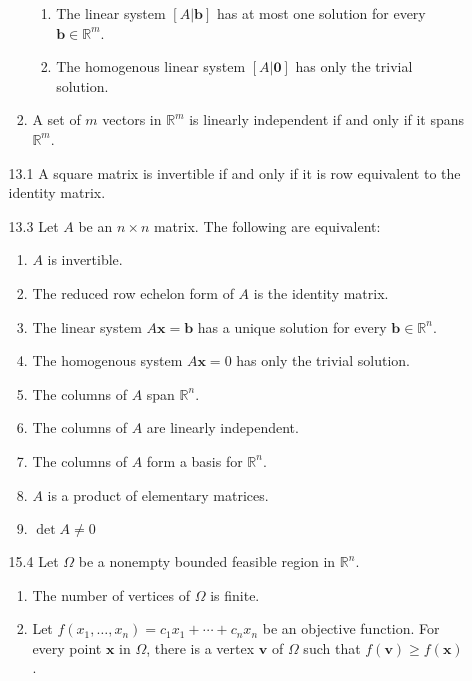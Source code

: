 \documentclass{article}
\begin{document}
\begin{multicols}{2}
\begin{itemize}[leftmargin=0.5cm]
\begin{enumerate}
\begin{enumerate}
\begin{enumerate}
                            \item The linear system $[A|\textbf{b}]$ has at most one solution for every $\textbf{b}\in\mathbb{R}^m$.
                            \item The homogenous linear system $[A|\textbf{0}]$ has only the trivial solution.
                        \end{enumerate}
                    \item A set of $m$ vectors in $\mathbb{R}^m$ is linearly independent if and only if it spans $\mathbb{R}^m$.
                \end{enumerate}
            \item[13.1] A square matrix is invertible if and only if it is row equivalent to the identity matrix.
            \item [13.3] Let $A$ be an $n\times n$ matrix. The following are equivalent:
                \begin{enumerate}
                    \item $A$ is invertible.
                    \item The reduced row echelon form of $A$ is the identity matrix.
                    \item The linear system $A\textbf{x}=\textbf{b}$ has a unique solution for every $\textbf{b}\in\mathbb{R}^n$.
                    \item The homogenous system $A\textbf{x}=0$ has only the trivial solution.
                    \item The columns of $A$ span $\mathbb{R}^n$.
                    \item The columns of $A$ are linearly independent.
                    \item The columns of $A$ form a basis for $\mathbb{R}^n$.
                    \item $A$ is a product of elementary matrices.
                    \item $\det{A}\neq0$
                \end{enumerate}
            \item[15.4] Let $\Omega$ be a nonempty bounded feasible region in $\mathbb{R}^n$.
                \begin{enumerate}
                    \item The number of vertices of $\Omega$ is finite.
                    \item Let $f(x_1,\ldots,x_n)=c_1x_1+\cdots+c_nx_n$ be an objective function. For every point $\textbf{x}$ in $\Omega$, there is a vertex $\textbf{v}$ of $\Omega$ such that $f(\textbf{v})\geq f(\textbf{x})$.

\end{enumerate}
\end{enumerate}
\end{itemize}
\end{multicols}
\end{document}
